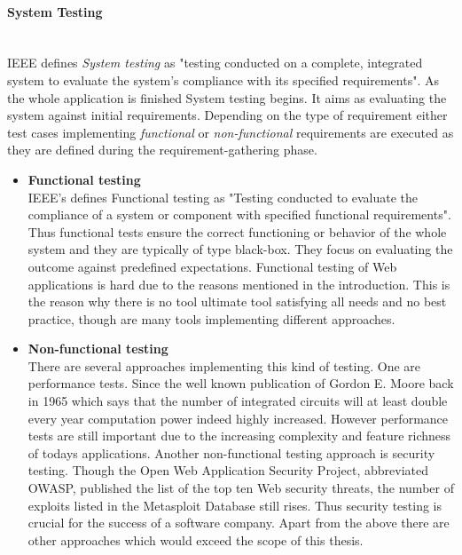 \documentclass[12pt, notitlepage]{article}
\begin{document}
\paragraph{System Testing} ~\\
IEEE defines \textit{System testing} as\cite{ieee-definition} "testing conducted on a complete, integrated system to evaluate the system's compliance with its specified requirements". As the whole application is finished System testing begins. It aims as evaluating the system against initial requirements.
Depending on the type of requirement either test cases implementing \textit{functional} or \textit{non-functional} requirements are executed as they are defined during the requirement-gathering phase. 
\begin{itemize}
	\item \textbf{Functional testing}\\
	IEEE's defines Functional testing as \cite{ieee-definition}
	"Testing conducted to evaluate the compliance of a system or component with specified functional requirements". Thus functional tests ensure
	the correct functioning or behavior of the whole system and they are typically of type black-box.
	They focus on evaluating the outcome against predefined expectations. Functional testing of Web applications is hard due to the
	reasons mentioned in the introduction. This is the reason why there is no tool ultimate tool satisfying all needs and no best practice, though are many
	tools implementing different approaches.
	\item \textbf{Non-functional testing}\\
	There are several approaches implementing this kind of testing. One are performance tests. Since the well known publication of Gordon E. Moore back in 
	1965\cite{moore} which says that the number of integrated circuits will at least double every year computation power indeed highly increased.
	However performance tests are still important due to the increasing complexity and feature richness of todays applications. Another non-functional 
	testing approach is security testing. Though the Open Web Application Security Project, abbreviated OWASP\cite{owasp}, published the list of the top ten
	Web security threats, the number of exploits listed in the Metasploit Database\cite{metasploit} still rises. Thus security testing is crucial for the success
	of a software company. Apart from the above there are other approaches which would exceed the scope of this thesis. 
\end{itemize}
\end{document}
